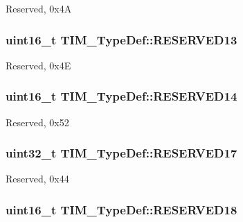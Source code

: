 Reserved, 0x4\-A \hypertarget{struct_t_i_m___type_def_a5a831b0a42a5428fbbfd550b7a9c8108}{
\subsubsection[{R\-E\-S\-E\-R\-V\-E\-D13}]{\setlength{\rightskip}{0pt plus 5cm}uint16\-\_\-t T\-I\-M\-\_\-\-Type\-Def\-::\-R\-E\-S\-E\-R\-V\-E\-D13}}\label{struct_t_i_m___type_def_a5a831b0a42a5428fbbfd550b7a9c8108}
Reserved, 0x4\-E \hypertarget{struct_t_i_m___type_def_a548510ebbe395a3947dbbc49fcccec0d}{
\subsubsection[{R\-E\-S\-E\-R\-V\-E\-D14}]{\setlength{\rightskip}{0pt plus 5cm}uint16\-\_\-t T\-I\-M\-\_\-\-Type\-Def\-::\-R\-E\-S\-E\-R\-V\-E\-D14}}\label{struct_t_i_m___type_def_a548510ebbe395a3947dbbc49fcccec0d}
Reserved, 0x52 \hypertarget{struct_t_i_m___type_def_a4f1ca99eb41a95117de38bb0c66808f3}{
\subsubsection[{R\-E\-S\-E\-R\-V\-E\-D17}]{\setlength{\rightskip}{0pt plus 5cm}uint32\-\_\-t T\-I\-M\-\_\-\-Type\-Def\-::\-R\-E\-S\-E\-R\-V\-E\-D17}}\label{struct_t_i_m___type_def_a4f1ca99eb41a95117de38bb0c66808f3}
Reserved, 0x44 \hypertarget{struct_t_i_m___type_def_a5f03da5369c7b0bf10fd480011b12718}{
\subsubsection[{R\-E\-S\-E\-R\-V\-E\-D18}]{\setlength{\rightskip}{0pt plus 5cm}uint16\-\_\-t T\-I\-M\-\_\-\-Type\-Def\-::\-R\-E\-S\-E\-R\-V\-E\-D18}}\label{struct_t_i_m___type_def_a5f03da5369c7b0bf10fd480011b12718}
